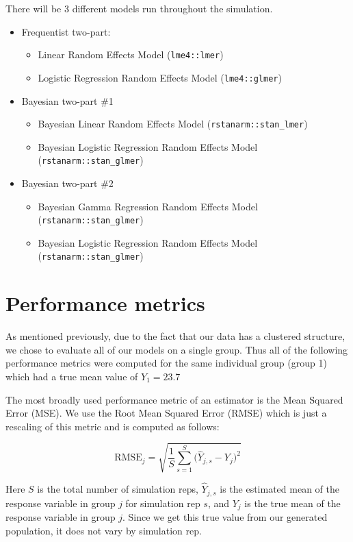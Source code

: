 \documentclass[12pt,twoside]{reedthesis}
\providecommand{\tightlist}{%
  \setlength{\itemsep}{0pt}\setlength{\parskip}{0pt}}
\begin{document}
There will be 3 different models run throughout the simulation.
\begin{itemize}
\tightlist
\item
  Frequentist two-part:
  \begin{itemize}
  \tightlist
  \item
    Linear Random Effects Model (\texttt{lme4::lmer})
  \item
    Logistic Regression Random Effects Model (\texttt{lme4::glmer})
  \end{itemize}
\item
  Bayesian two-part \#1
  \begin{itemize}
  \tightlist
  \item
    Bayesian Linear Random Effects Model (\texttt{rstanarm::stan\_lmer})
  \item
    Bayesian Logistic Regression Random Effects Model (\texttt{rstanarm::stan\_glmer})
  \end{itemize}
\item
  Bayesian two-part \#2
  \begin{itemize}
  \tightlist
  \item
    Bayesian Gamma Regression Random Effects Model (\texttt{rstanarm::stan\_glmer})
  \item
    Bayesian Logistic Regression Random Effects Model (\texttt{rstanarm::stan\_glmer})
  \end{itemize}
\end{itemize}
\hypertarget{metrics}{%
\section{Performance metrics}\label{metrics}}

As mentioned previously, due to the fact that our data has a clustered structure, we chose to evaluate all of our models on a single group. Thus all of the following performance metrics were computed for the same individual group (group 1) which had a true mean value of \(Y_1 = 23.7\)

The most broadly used performance metric of an estimator is the Mean Squared Error (MSE). We use the Root Mean Squared Error (RMSE) which is just a rescaling of this metric and is computed as follows:

\[
\text{RMSE}_j  = \sqrt{\frac{1}{S}\sum_{s = 1}^{S}\bigg(\hat{Y}_{j, s} - Y_{j}\bigg)^2}
\]

Here \(S\) is the total number of simulation reps, \(\hat{Y}_{j, s}\) is the estimated mean of the response variable in group \(j\) for simulation rep \(s\), and \(Y_{j}\) is the true mean of the response variable in group \(j\). Since we get this true value from our generated population, it does not vary by simulation rep.
\end{document}
